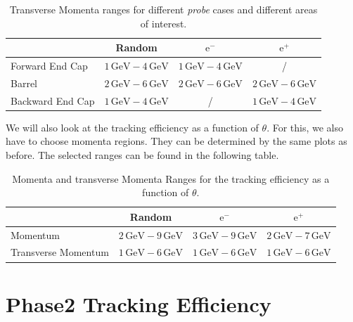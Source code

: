 \documentclass[a4paper,11pt,twosided,final,german,openbib,pdftex,listof=totoc,bibliography=totoc]{scrbook}
\begin{document}
\begin{table}[h!]
	\centering
	\begin{tabular}{lccc}
		&Random&$\textrm{e}^-$ &$\textrm{e}^+$\\
		\hline
		Forward End Cap &$1\,\textrm{GeV} - 4\,\textrm{GeV}$&$1\,\textrm{GeV} - 4\,\textrm{GeV}$&/\\
		Barrel &$2\,\textrm{GeV} - 6\,\textrm{GeV}$&$2\,\textrm{GeV} - 6\,\textrm{GeV}$&$2\,\textrm{GeV} - 6\,\textrm{GeV}$\\
		Backward End Cap &$1\,\textrm{GeV} - 4\,\textrm{GeV}$& /&$1\,\textrm{GeV} - 4\,\textrm{GeV}$\\
	\end{tabular}
	
	\caption[Areas Of Interest Different Transverse Momenta Ranges]{Transverse Momenta ranges for different \textit{probe} cases and different areas of interest.}
	\label{tab:RTPtMDTable}
\end{table}








We will also look at the tracking efficiency as a function of $\theta$. For this, we also have to choose momenta regions. They can be determined by the same plots as before.
The selected ranges can be found in the following table.

\begin{table}[h!]
	\centering
	\begin{tabular}{lccc}
		&Random&$\textrm{e}^-$ &$\textrm{e}^+$\\
		\hline
		Momentum &$2\,\textrm{GeV} - 9\,\textrm{GeV}$&$3\,\textrm{GeV} - 9\,\textrm{GeV}$&$2\,\textrm{GeV} - 7\,\textrm{GeV}$\\
		Transverse Momentum &$1\,\textrm{GeV} - 6\,\textrm{GeV}$&$1\,\textrm{GeV} - 6\,\textrm{GeV}$&$1\,\textrm{GeV} - 6\,\textrm{GeV}$\\

	\end{tabular}
	
	\caption[Different (Transverse-) Momenta Ranges For $\theta$ Efficiency]{Momenta and transverse Momenta Ranges for the tracking efficiency as a function of $\theta$.}
	\label{tab:RTPMDThetaTable}
\end{table}




\chapter{Phase2 Tracking Efficiency}
\label{chp:TrackingEfficiencyPhase2}
\end{document}
